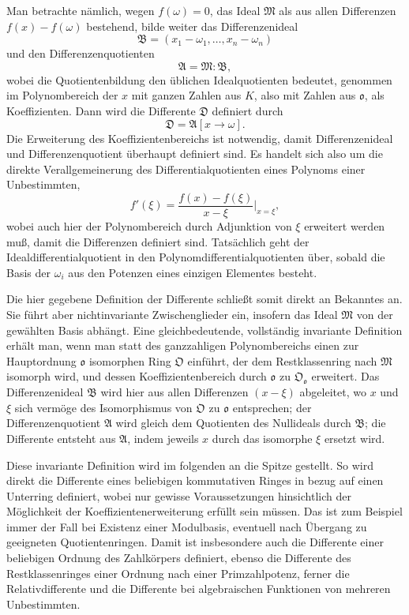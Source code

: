 \documentclass[11pt]{article}
\begin{document}
Man betrachte nämlich, wegen $f(\omega)=0$, das Ideal $\mathfrak M$ als aus allen Differenzen $f(x)-f(\omega)$ bestehend, bilde weiter das Differenzenideal
\[
        \mathfrak B=(x_1-\omega_1,\ldots,x_n-\omega_n)
\]
und den Differenzenquotienten
\[
        \mathfrak A=\mathfrak M:\mathfrak B,
\]
wobei die Quotientenbildung den üblichen Idealquotienten bedeutet, genommen im Polynombereich der $x$ mit ganzen Zahlen aus $K$, also mit Zahlen aus $\mathfrak o$, als Koeffizienten. Dann wird die Differente $\mathfrak D$ definiert durch
\[
        \mathfrak D=\mathfrak A[x\to\omega].
\]
Die Erweiterung des Koeffizientenbereichs ist notwendig, damit Differenzenideal und Differenzenquotient überhaupt definiert sind. Es handelt sich also um die direkte Verallgemeinerung des Differentialquotienten eines Polynoms einer Unbestimmten,
\[
        f'(\xi)=\frac{f(x)-f(\xi)}{x-\xi}\bigg|_{x=\xi},
\]
wobei auch hier der Polynombereich durch Adjunktion von $\xi$ erweitert werden muß, damit die Differenzen definiert sind. Tatsächlich geht der Idealdifferentialquotient in den Polynomdifferentialquotienten über, sobald die Basis der $\omega_i$ aus den Potenzen eines einzigen Elementes besteht.

Die hier gegebene Definition der Differente schließt somit direkt an Bekanntes an. Sie führt aber nichtinvariante Zwischenglieder ein, insofern das Ideal $\mathfrak M$ von der gewählten Basis abhängt. Eine gleichbedeutende, vollständig invariante Definition erhält man, wenn man statt des ganzzahligen Polynombereichs einen zur Hauptordnung $\mathfrak o$ isomorphen Ring $\mathfrak O$ einführt, der dem Restklassenring nach $\mathfrak M$ isomorph wird, und dessen Koeffizientenbereich durch $\mathfrak o$ zu $\mathfrak O_{\mathfrak o}$ erweitert. Das Differenzenideal $\mathfrak B$ wird hier aus allen Differenzen $(x-\xi)$ abgeleitet, wo $x$ und $\xi$ sich vermöge des Isomorphismus von $\mathfrak O$ zu $\mathfrak o$ entsprechen; der Differenzenquotient $\mathfrak A$ wird gleich dem Quotienten des Nullideals durch $\mathfrak B$; die Differente entsteht aus $\mathfrak A$, indem jeweils $x$ durch das isomorphe $\xi$ ersetzt wird.

Diese invariante Definition wird im folgenden an die Spitze gestellt. So wird direkt die Differente eines beliebigen kommutativen Ringes in bezug auf einen Unterring definiert, wobei nur gewisse Voraussetzungen hinsichtlich der Möglichkeit der Koeffizientenerweiterung erfüllt sein müssen. Das ist zum Beispiel immer der Fall bei Existenz einer Modulbasis, eventuell nach Übergang zu geeigneten Quotientenringen. Damit ist insbesondere auch die Differente einer beliebigen Ordnung des Zahlkörpers definiert, ebenso die Differente des Restklassenringes einer Ordnung nach einer Primzahlpotenz, ferner die Relativdifferente und die Differente bei algebraischen Funktionen von mehreren Unbestimmten.
\end{document}

